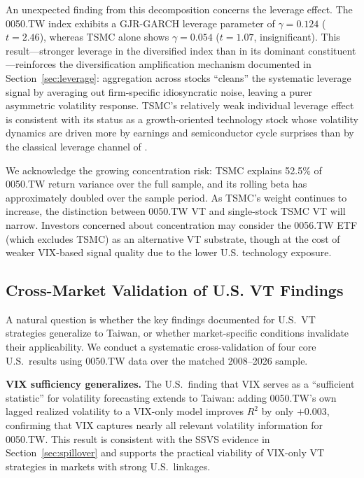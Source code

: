 An unexpected finding from this decomposition concerns the leverage effect. The 0050.TW index exhibits a GJR-GARCH leverage parameter of $\gamma = 0.124$ ($t = 2.46$), whereas TSMC alone shows $\gamma = 0.054$ ($t = 1.07$, insignificant). This result---stronger leverage in the diversified index than in its dominant constituent---reinforces the diversification amplification mechanism documented in Section~\ref{sec:leverage}: aggregation across stocks ``cleans'' the systematic leverage signal by averaging out firm-specific idiosyncratic noise, leaving a purer asymmetric volatility response. TSMC's relatively weak individual leverage effect is consistent with its status as a growth-oriented technology stock whose volatility dynamics are driven more by earnings and semiconductor cycle surprises than by the classical leverage channel of \citet{black1976}.

We acknowledge the growing concentration risk: TSMC explains 52.5\% of 0050.TW return variance over the full sample, and its rolling beta has approximately doubled over the sample period. As TSMC's weight continues to increase, the distinction between 0050.TW VT and single-stock TSMC VT will narrow. Investors concerned about concentration may consider the 0056.TW ETF (which excludes TSMC) as an alternative VT substrate, though at the cost of weaker VIX-based signal quality due to the lower U.S. technology exposure.

\subsection{Cross-Market Validation of U.S. VT Findings}
\label{sec:cross_validation}

A natural question is whether the key findings documented for U.S.\ VT strategies generalize to Taiwan, or whether market-specific conditions invalidate their applicability. We conduct a systematic cross-validation of four core U.S.\ results using 0050.TW data over the matched 2008--2026 sample.

\textbf{VIX sufficiency generalizes.} The U.S.\ finding that VIX serves as a ``sufficient statistic'' for volatility forecasting extends to Taiwan: adding 0050.TW's own lagged realized volatility to a VIX-only model improves $R^2$ by only $+0.003$, confirming that VIX captures nearly all relevant volatility information for 0050.TW. This result is consistent with the SSVS evidence in Section~\ref{sec:spillover} and supports the practical viability of VIX-only VT strategies in markets with strong U.S.\ linkages.

